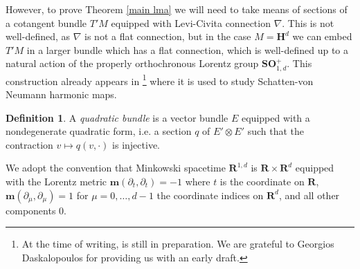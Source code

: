 \documentclass[reqno,10pt]{amsart}
\newcommand{\RR}{\mathbf{R}}
\newcommand{\Hyp}{\mathbf H}
\newcommand{\SpOrth}{\mathbf{SO}}
\newcommand{\Mink}{\mathbf m}
\newcommand{\dfn}[1]{\emph{#1}\index{#1}}
\theoremstyle{definition}
\newtheorem{definition}[theorem]{Definition}
\numberwithin{equation}{section}
\begin{document}
However, to prove Theorem \ref{main lma} we will need to take means of sections of a cotangent bundle $T'M$ equipped with Levi-Civita connection $\nabla$.
This is not well-defined, as $\nabla$ is not a flat connection, but in the case $M = \Hyp^d$ we can embed $T'M$ in a larger bundle which has a flat connection, which is well-defined up to a natural action of the properly orthochronous Lorentz group $\SpOrth_{1, d}^+$.
This construction already appears in \cite{daskalopoulosPrep1}\footnote{At the time of writing, \cite{daskalopoulosPrep1} is still in preparation. We are grateful to Georgios Daskalopoulos for providing us with an early draft.} where it is used to study Schatten-von Neumann harmonic maps.

\begin{definition}
A \dfn{quadratic bundle} is a vector bundle $E$ equipped with a nondegenerate quadratic form, i.e. a section $q$ of $E' \otimes E'$ such that the contraction $v \mapsto q(v, \cdot)$ is injective.
\end{definition}

We adopt the convention that Minkowski spacetime $\RR^{1, d}$ is $\RR \times \RR^d$ equipped with the Lorentz metric $\Mink(\partial_t, \partial_t) = -1$ where $t$ is the coordinate on $\RR$, $\Mink(\partial_\mu, \partial_\mu) = 1$ for $\mu = 0, \dots, d - 1$ the coordinate indices on $\RR^d$, and all other components $0$.
\end{document}
